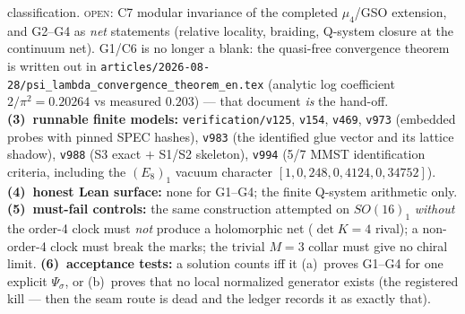 \documentclass[11pt,a4paper]{article}
\begin{document}
classification.  \textsc{open}: C7 modular invariance of the completed $\mu_4$/GSO extension, and G2--G4 as
\emph{net} statements (relative locality, braiding, Q-system closure at the continuum net).
G1/C6 is no longer a blank: the quasi-free convergence theorem is written out in
\texttt{articles/2026-08-28/psi\_lambda\_convergence\_theorem\_en.tex} (analytic log coefficient
$2/\pi^2=0.20264$ vs measured $0.203$) --- that document \emph{is} the hand-off.
\textbf{(3)~runnable finite models:} \texttt{verification/v125}, \texttt{v154}, \texttt{v469},
\texttt{v973} (embedded probes with pinned SPEC hashes), \texttt{v983} (the identified glue
vector and its lattice shadow), \texttt{v988} (S3 exact $+$ S1/S2 skeleton),
\texttt{v994} (5/7 MMST identification criteria, including the $(E_8)_1$ vacuum character
$[1,0,248,0,4124,0,34752]$).
\textbf{(4)~honest Lean surface:} none for G1--G4; the finite Q-system arithmetic only.
\textbf{(5)~must-fail controls:} the same construction attempted on $SO(16)_1$ \emph{without}
the order-4 clock must \emph{not} produce a holomorphic net ($\det K = 4$ rival); a
non-order-4 clock must break the marks; the trivial $M{=}3$ collar must give no chiral limit.
\textbf{(6)~acceptance tests:} a solution counts iff it (a)~proves G1--G4 for one explicit
$\Psi_\sigma$, or (b)~proves that no local normalized generator exists (the registered kill ---
then the seam route is dead and the ledger records it as exactly that).

\end{document}
